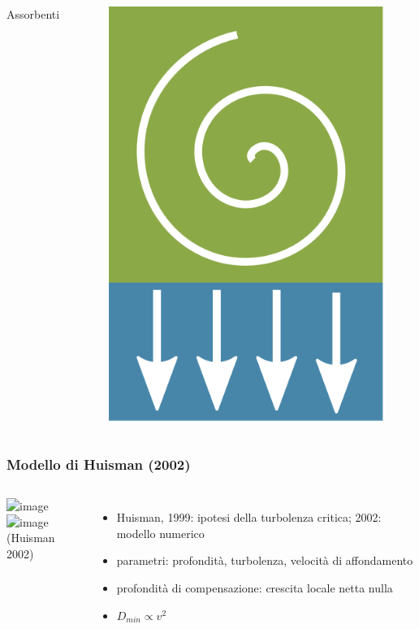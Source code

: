 \begin{frame}
\begin{columns}
    Assorbenti
    \begin{figure}
      \includegraphics[width=.7\textwidth]{../img/ML}
    \end{figure}

  \end{columns}
\end{frame}


\begin{frame}
  \frametitle{Modello di Huisman (2002)}
  \begin{columns}

    \includegraphics<1>[width=\textwidth]{../img/result_Huis_lowvel}
    \includegraphics<2>[width=\textwidth]{../img/result_Huis_hivel}
    \\
    (Huisman 2002)

    \begin{itemize}
      \item Huisman, 1999: ipotesi della turbolenza critica; 2002: modello numerico
      \item parametri: profondità, turbolenza, velocità di affondamento
      \item profondità di compensazione: crescita locale netta nulla
      \item \( D_{min} \propto v^2 \)
    \end{itemize}

  \end{columns}
\end{frame}

